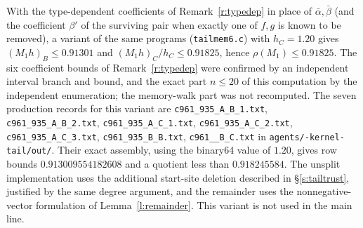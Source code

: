 \begin{remark}\label{r:tailtypedep}
With the type-dependent coefficients of Remark~\ref{r:typedep} in place of $\bar\alpha, \bar\beta$ (and the coefficient $\beta'$ of the surviving pair when exactly one of $f, g$ is known to be removed), a variant of the same programs (\texttt{tailmem6.c}) with $h_C = 1.20$ gives $(M_1 h)_B \le 0.91301$ and $(M_1 h)_C / h_C \le 0.91825$, hence $\rho(M_1) \le 0.91825$. The six coefficient bounds of Remark~\ref{r:typedep} were confirmed by an independent interval branch and bound, and the exact part $n \le 20$ of this computation by the independent enumeration; the memory-walk part was not recomputed. The seven production records for this variant are
\texttt{c961\_935\_A\_B\_1.txt}, \texttt{c961\_935\_A\_B\_2.txt},
\texttt{c961\_935\_A\_C\_1.txt}, \texttt{c961\_935\_A\_C\_2.txt},
\texttt{c961\_935\_A\_C\_3.txt}, \texttt{c961\_935\_B\_B.txt},
\texttt{c961\_\_\allowbreak B\_\allowbreak C.txt} in \texttt{agents/-kernel-tail/\allowbreak out/}.
Their exact assembly, using the binary64 value of $1.20$, gives row bounds
$0.913009554182608$ and a quotient less than $0.918245584$.
The unsplit implementation uses the additional start-site deletion described in \S\ref{s:tailtrust}, justified by the same degree argument, and the remainder uses the nonnegative-vector formulation of Lemma~\ref{l:remainder}.
This variant is not used in the main line.
\end{remark}
